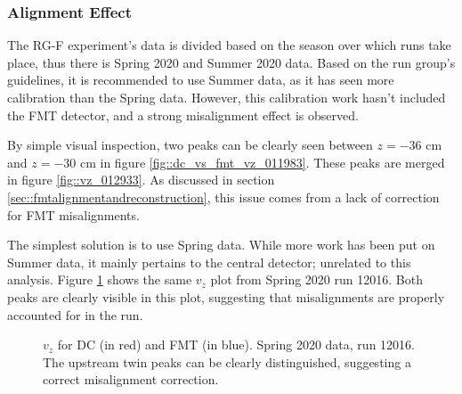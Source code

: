 \subsubsection{Alignment Effect}
    The RG-F experiment's data is divided based on the season over which runs take place, thus there is Spring 2020 and Summer 2020 data.
    Based on the run group's guidelines, it is recommended to use Summer data, as it has seen more calibration than the Spring data.
    However, this calibration work hasn't included the FMT detector, and a strong misalignment effect is observed.

    By simple visual inspection, two peaks can be clearly seen between $z = -36$ cm and $z = -30$ cm in figure \ref{fig::dc_vs_fmt_vz_011983}.
    These peaks are merged in figure \ref{fig::vz_012933}.
    As discussed in section \ref{sec::fmtalignmentandreconstruction}, this issue comes from a lack of correction for FMT misalignments.

    The simplest solution is to use Spring data.
    While more work has been put on Summer data, it mainly pertains to the central detector; unrelated to this analysis.
    Figure \ref{fig::vz_012016} shows the same $v_z$ plot from Spring 2020 run 12016.
    Both peaks are clearly visible in this plot, suggesting that misalignments are properly accounted for in the run.

    \begin{figure}[t!]
        \centering{}
        \caption[$v_z$ for DC and FMT, run 12016]{$v_z$ for DC (in red) and FMT (in blue). Spring 2020 data, run 12016. The upstream twin peaks can be clearly distinguished, suggesting a correct misalignment correction.}
        \label{fig::vz_012016}
    \end{figure}
